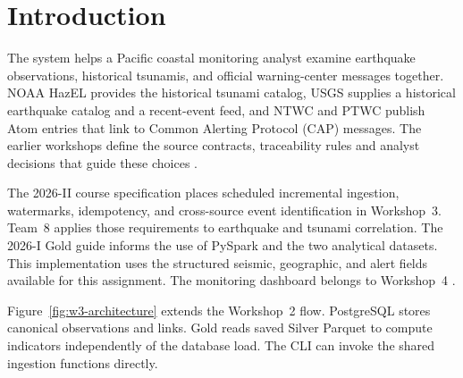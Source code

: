 \documentclass[a4paper,11pt,oneside]{book}
\begin{document}
    \mainmatter


\chapter{Introduction}
\label{ch:intro}
The system helps a Pacific coastal monitoring analyst examine earthquake observations, historical tsunamis, and official warning-center messages together. NOAA HazEL provides the historical tsunami catalog, USGS supplies a historical earthquake catalog and a recent-event feed, and NTWC and PTWC publish Atom entries that link to Common Alerting Protocol (CAP) messages. The earlier workshops define the source contracts, traceability rules and analyst decisions that guide these choices \cite{workshop1,workshop2,hazel,usgsfdsn,usgsfeed,tsunamigov}.

The 2026-II course specification places scheduled incremental ingestion, watermarks, idempotency, and cross-source event identification in Workshop~3. Team~8 applies those requirements to earthquake and tsunami correlation. The 2026-I Gold guide informs the use of PySpark and the two analytical datasets. This implementation uses the structured seismic, geographic, and alert fields available for this assignment. The monitoring dashboard belongs to Workshop~4 \cite{courseproject,teamassignment,goldguide}.

Figure~\ref{fig:w3-architecture} extends the Workshop~2 flow. PostgreSQL stores canonical observations and links. Gold reads saved Silver Parquet to compute indicators independently of the database load. The CLI can invoke the shared ingestion functions directly.
\end{document}
